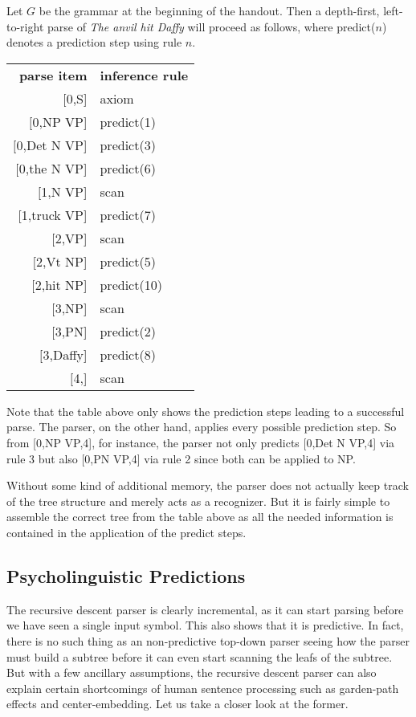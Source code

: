 \begin{examplebox}
    Let $G$ be the grammar at the beginning of the handout.
    Then a depth-first, left-to-right parse of \emph{The anvil hit Daffy} will proceed as follows, where predict($n$) denotes a prediction step using rule $n$.
    \begin{center}
        \begin{tabular}{r|l}
            \textbf{parse item} & \textbf{inference rule}\\
            $\lbrack$0,S] & axiom\\
            $\lbrack$0,NP VP] & predict(1)\\
            $\lbrack$0,Det N VP] & predict(3)\\
            $\lbrack$0,the N VP] & predict(6)\\
            $\lbrack$1,N VP] & scan\\
            $\lbrack$1,truck VP] & predict(7)\\
            $\lbrack$2,VP] & scan\\
            $\lbrack$2,Vt NP] & predict(5)\\
            $\lbrack$2,hit NP] & predict(10)\\
            $\lbrack$3,NP] & scan\\
            $\lbrack$3,PN] & predict(2)\\
            $\lbrack$3,Daffy] & predict(8)\\
            $\lbrack$4,] & scan
        \end{tabular}
    \end{center}
    Note that the table above only shows the prediction steps leading to a successful parse.
    The parser, on the other hand, applies every possible prediction step.
    So from [0,NP VP,4], for instance, the parser not only predicts [0,Det N VP,4] via rule 3 but also [0,PN VP,4] via rule 2 since both can be applied to NP\@.
\end{examplebox}
%
Without some kind of additional memory, the parser does not actually keep track of the tree structure and merely acts as a recognizer.
But it is fairly simple to assemble the correct tree from the table above as all the needed information is contained in the application of the predict steps.

\subsection{Psycholinguistic Predictions}
The recursive descent parser is clearly incremental, as it can start parsing before we have seen a single input symbol.
This also shows that it is predictive.
In fact, there is no such thing as an non-predictive top-down parser seeing how the parser must build a subtree before it can even start scanning the leafs of the subtree.
But with a few ancillary assumptions, the recursive descent parser can also explain certain shortcomings of human sentence processing such as garden-path effects and center-embedding.
Let us take a closer look at the former.

